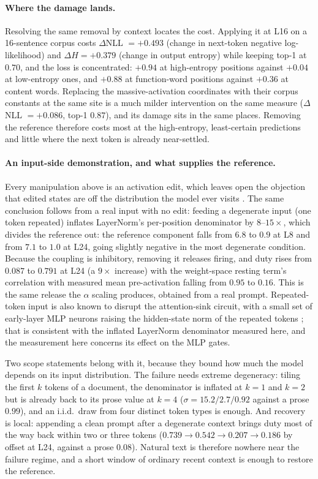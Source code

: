 \documentclass[11pt]{article}
\begin{document}
\paragraph{Where the damage lands.} Resolving the same removal by
context locates the cost. Applying it at L16 on a 16-sentence corpus
costs $\Delta$NLL $= +0.493$ (change in next-token negative
log-likelihood) and $\Delta H = +0.379$ (change in output entropy) while keeping
top-1 at $0.70$, and the loss is concentrated: $+0.94$ at
high-entropy positions against $+0.04$ at low-entropy ones, and
$+0.88$ at function-word positions against $+0.36$ at content words.
Replacing the massive-activation coordinates with their corpus
constants at the same site is a much milder intervention on the same measure ($\Delta$NLL $= +0.086$, top-1 $0.87$), and its damage sits in
the same places. Removing the reference therefore costs most at the high-entropy, least-certain
predictions and little where the next token is already near-settled.

\paragraph{An input-side demonstration, and what supplies the
reference.} Every manipulation above is an activation edit, which leaves
open the objection that edited states are off the distribution the model
ever visits \citep{mishra2026}. The same conclusion follows from a real input
with no edit: feeding a degenerate input (one token repeated) inflates LayerNorm's per-position denominator by $8$--$15\times$, which
divides the reference out: the reference
component falls from $6.8$ to $0.9$ at L8 and from $7.1$ to $1.0$ at
L24, going slightly negative in the most degenerate condition. Because
the coupling is inhibitory, removing it releases firing, and duty rises
from $0.087$ to $0.791$ at L24 (a $9\times$ increase) with the
weight-space resting term's correlation with measured mean
pre-activation falling from $0.95$ to $0.16$. This is the same
release the $\alpha$ scaling produces, obtained from a real prompt.
Repeated-token input is also known to disrupt the attention-sink
circuit, with a small set of early-layer MLP neurons raising the
hidden-state norm of the repeated tokens \citep{yona2025}; that is
consistent with the inflated LayerNorm denominator measured here, and
the measurement here concerns its effect on the MLP gates.

Two scope statements belong with it, because they bound how much the
model depends on its input distribution. The failure needs extreme
degeneracy: tiling the first $k$ tokens of a document, the denominator
is inflated at $k=1$ and $k=2$ but is already back to its prose value at
$k=4$ ($\sigma = 15.2 / 2.7 / 0.92$ against a prose $0.99$), and an
i.i.d.\ draw from four distinct token types is enough. And recovery is
local: appending a clean prompt after a degenerate context brings duty
most of the way back within two or three tokens ($0.739 \to 0.542 \to 0.207 \to 0.186$ by
offset at L24, against a prose $0.08$). Natural text is therefore
nowhere near the failure regime, and a short window of ordinary recent
context is enough to restore the reference. 
\end{document}

